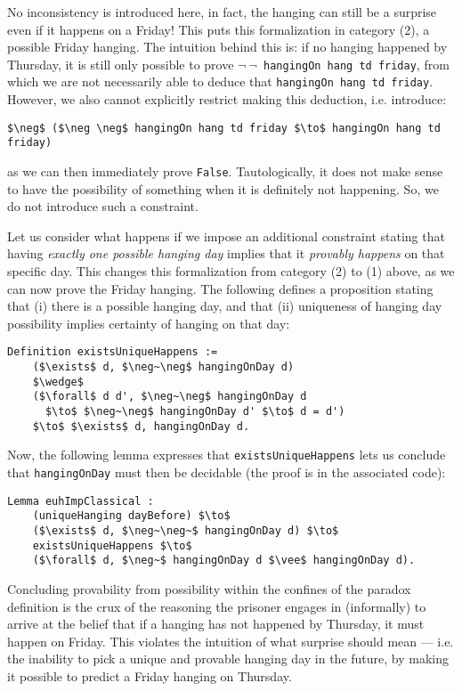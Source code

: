 \documentclass[runningheads]{llncs}
\begin{document}
No inconsistency is introduced here, in fact, the hanging can still be a surprise even if it
happens on a Friday! This puts this formalization in category (2), a possible Friday hanging.
The intuition behind this is: if no hanging happened by
Thursday, it is still only possible to prove {\tt $\neg~\neg$~hangingOn hang td friday},
from which we are not necessarily able to deduce that {\tt hangingOn hang td friday}.
However, we also cannot explicitly restrict making this deduction, i.e. introduce:

\begin{lstlisting}[mathescape=true]
    $\neg$ ($\neg \neg$ hangingOn hang td friday $\to$ hangingOn hang td friday)
\end{lstlisting}

as we can then immediately prove {\tt False}. Tautologically, it does not make sense to have the possibility
of something when it is definitely not happening. So, we do not introduce
such a constraint.

Let us consider what happens if we impose an additional constraint stating that having
\emph{exactly one possible hanging day}
implies that it \emph{provably happens} on that specific day. This changes this
formalization from category (2) to (1) above, as we can now prove the Friday
hanging. The following defines a
proposition stating that (i) there is a possible hanging day, and that (ii) uniqueness of hanging day
possibility implies certainty of hanging on that day:

\begin{lstlisting}[mathescape=true]
  Definition existsUniqueHappens :=
    ($\exists$ d, $\neg~\neg$ hangingOnDay d)
    $\wedge$
    ($\forall$ d d', $\neg~\neg$ hangingOnDay d
      $\to$ $\neg~\neg$ hangingOnDay d' $\to$ d = d')
    $\to$ $\exists$ d, hangingOnDay d.
\end{lstlisting}

Now, the following lemma expresses that {\tt existsUniqueHappens} lets us
conclude that {\tt hangingOnDay} must then be decidable (the proof is in the
associated code):

\begin{lstlisting}[mathescape=true]
  Lemma euhImpClassical :
    (uniqueHanging dayBefore) $\to$
    ($\exists$ d, $\neg~\neg~$ hangingOnDay d) $\to$
    existsUniqueHappens $\to$
    ($\forall$ d, $\neg~$ hangingOnDay d $\vee$ hangingOnDay d).
\end{lstlisting}

Concluding provability from possibility within the confines of the paradox definition
is the crux of the reasoning the prisoner
engages in (informally) to arrive at the belief that
if a hanging has not happened by Thursday, it must happen on Friday.
This violates the intuition of what surprise should mean --- i.e. the inability
to pick a unique and provable hanging day in the future, by making it possible
to predict a Friday hanging on Thursday.
\end{document}
